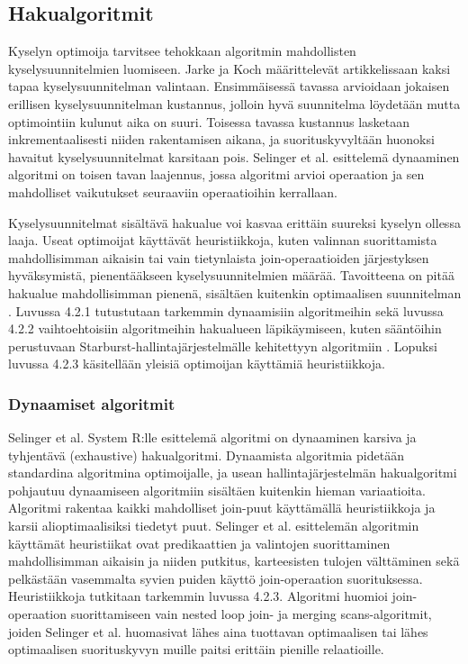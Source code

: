 \documentclass[finnish]{tktltiki2}
\theoremstyle{definition}
\theoremstyle{remark}
\begin{document}
\subsection{Hakualgoritmit}
Kyselyn optimoija tarvitsee tehokkaan algoritmin mahdollisten kyselysuunnitelmien luomiseen. Jarke ja Koch määrittelevät artikkelissaan \cite{jarke1984} kaksi tapaa kyselysuunnitelman valintaan. Ensimmäisessä tavassa arvioidaan jokaisen erillisen kyselysuunnitelman kustannus, jolloin hyvä suunnitelma löydetään mutta optimointiin kulunut aika on suuri. Toisessa tavassa kustannus lasketaan inkrementaalisesti niiden rakentamisen aikana, ja suorituskyvyltään huonoksi havaitut kyselysuunnitelmat karsitaan pois. Selinger et al. esittelemä dynaaminen algoritmi \cite{selinger1979access} on toisen tavan laajennus, jossa algoritmi arvioi operaation ja sen mahdolliset vaikutukset seuraaviin operaatioihin kerrallaan. 

Kyselysuunnitelmat sisältävä hakualue voi kasvaa erittäin suureksi kyselyn ollessa laaja. Useat optimoijat käyttävät heuristiikkoja, kuten valinnan suorittamista mahdollisimman aikaisin tai vain tietynlaista join-operaatioiden järjestyksen hyväksymistä, pienentääkseen kyselysuunnitelmien määrää. Tavoitteena on pitää hakualue mahdollisimman pienenä, sisältäen kuitenkin optimaalisen suunnitelman \cite{jarke1984}. Luvussa 4.2.1 tutustutaan tarkemmin dynaamisiin algoritmeihin sekä luvussa 4.2.2 vaihtoehtoisiin algoritmeihin hakualueen läpikäymiseen, kuten sääntöihin perustuvaan Starburst-hallintajärjestelmälle kehitettyyn algoritmiin \cite{lohman1988grammar}. Lopuksi luvussa 4.2.3 käsitellään yleisiä optimoijan käyttämiä heuristiikkoja.

\subsubsection{Dynaamiset algoritmit}
Selinger et al. System R:lle esittelemä algoritmi on dynaaminen karsiva ja tyhjentävä (exhaustive) hakualgoritmi. Dynaamista algoritmia pidetään standardina algoritmina optimoijalle, ja usean hallintajärjestelmän hakualgoritmi pohjautuu dynaamiseen algoritmiin sisältäen kuitenkin hieman variaatioita. Algoritmi rakentaa kaikki mahdolliset join-puut käyttämällä heuristiikkoja ja karsii alioptimaalisiksi tiedetyt puut. Selinger et al. esittelemän algoritmin käyttämät heuristiikat ovat predikaattien ja valintojen suorittaminen mahdollisimman aikaisin ja niiden putkitus, karteesisten tulojen välttäminen sekä pelkästään vasemmalta syvien puiden käyttö join-operaation suorituksessa. Heuristiikkoja tutkitaan tarkemmin luvussa 4.2.3. Algoritmi huomioi join-operaation suorittamiseen vain nested loop join- ja merging scans-algoritmit, joiden Selinger et al. huomasivat lähes aina tuottavan optimaalisen tai lähes optimaalisen suorituskyvyn muille paitsi erittäin pienille relaatioille.
\end{document}
